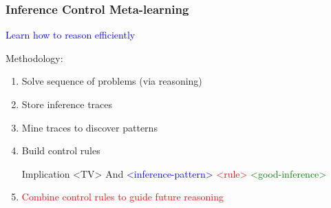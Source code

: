 \documentclass{beamer}
\begin{document}
\begin{frame}[fragile]
  \frametitle{Inference Control Meta-learning}
  \begin{center}\textcolor{blue}{Learn how to reason efficiently}\end{center}

  Methodology:
  \begin{enumerate}
  \item<+-> Solve sequence of problems (via reasoning)
  \item<+-> Store inference traces
  \item<+-> Mine traces to discover patterns
  \item<+-> Build control rules
{\small
\begin{semiverbatim}
  Implication <TV>
    And
      \textcolor{blue}{<inference-pattern>}
      \textcolor{red}{<rule>}
    \textcolor{green}{<good-inference>}
\end{semiverbatim}
}  
  \item<+-> \textcolor{red}{Combine control rules to guide future
      reasoning}
  \end{enumerate}
\end{frame}
\end{document}
